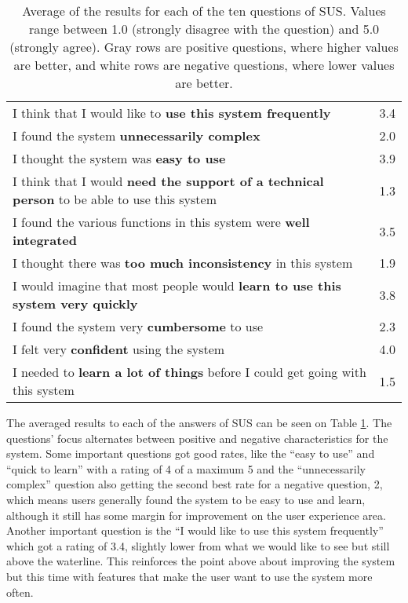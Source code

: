 \begin{table}[h]
	\renewcommand{\arraystretch}{1.5}
	\centering
\begin{tabular}{l|c}
I think that I would like to \textbf{use this system frequently} & 3.4\\
I found the system \textbf{unnecessarily complex} & 2.0\\
I thought the system was \textbf{easy to use} & 3.9\\
I think that I would \textbf{need the support of a technical person} to be able to use this system & 1.3\\
I found the various functions in this system were \textbf{well integrated} & 3.5\\
I thought there was \textbf{too much inconsistency} in this system & 1.9\\
I would imagine that most people would \textbf{learn to use this system very quickly} & 3.8\\
I found the system very \textbf{cumbersome} to use & 2.3\\
I felt very \textbf{confident} using the system & 4.0\\
I needed to \textbf{learn a lot of things} before I could get going with this system & 1.5\\
\end{tabular}
\caption[Average of the results for each of the ten questions of \ac{SUS}.]{Average of the results for each of the ten questions of \ac{SUS}. Values range between 1.0 (strongly disagree with the question) and 5.0 (strongly agree). Gray rows are positive questions, where higher values are better, and white rows are negative questions, where lower values are better.}
\label{tab:sus}
\vspace{\baselineskip}
\end{table}

The averaged results to each of the answers of \ac{SUS} can be seen on Table \ref{tab:sus}. The questions' focus alternates between positive and negative characteristics for the system. Some important questions got good rates, like the ``easy to use'' and ``quick to learn'' with a rating of 4 of a maximum 5 and the ``unnecessarily complex'' question also getting the second best rate for a negative question, 2, which means users generally found the system to be easy to use and learn, although it still has some margin for improvement on the user experience area. Another important question is the ``I would like to use this system frequently'' which got a rating of 3.4, slightly lower from what we would like to see but still above the waterline. This reinforces the point above about improving the system but this time with features that make the user want to use the system more often.

